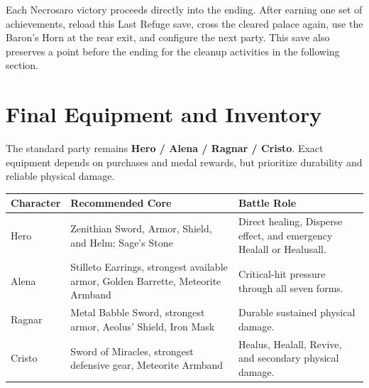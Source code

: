 \documentclass[
  american,
  10pt,
  letterpaper,
  oneside,
  open=any]{scrreprt}
\newcounter{none} %
\newenvironment{guidetable}{%
  \small\setstretch{1.0}%
  \setlength{\tabcolsep}{4pt}%
  \setlength{\LTpre}{8pt}\setlength{\LTpost}{10pt}%
  \renewcommand{\arraystretch}{1.16}%
}{ }
\begin{document}
Each Necrosaro victory proceeds directly into the ending. After earning
one set of achievements, reload this Last Refuge save, cross the cleared
palace again, use the Baron's Horn at the rear exit, and configure the
next party. This save also preserves a point before the ending for the
cleanup activities in the following section.

\section{Final Equipment and
Inventory}\label{final-equipment-and-inventory}

The standard party remains \textbf{Hero / Alena / Ragnar / Cristo}.
Exact equipment depends on purchases and medal rewards, but prioritize
durability and reliable physical damage.

\begin{guidetable}

{\def\LTcaptype{none} %
\begin{longtable}[]{@{}
  >{\raggedright\arraybackslash}p{}
  >{\raggedright\arraybackslash}p{}
  >{\raggedright\arraybackslash}p{}@{}}
\toprule\noalign{}
\begin{minipage}[b]{\linewidth}\raggedright
\color{GuideGreen}\bfseries Character
\end{minipage} & \begin{minipage}[b]{\linewidth}\raggedright
\color{GuideGreen}\bfseries Recommended Core
\end{minipage} & \begin{minipage}[b]{\linewidth}\raggedright
\color{GuideGreen}\bfseries Battle Role
\end{minipage} \\
\midrule\noalign{}
\endhead
\bottomrule\noalign{}
\endlastfoot
Hero & Zenithian Sword, Armor, Shield, and Helm; Sage's Stone & Direct
healing, Disperse effect, and emergency Healall or Healusall. \\
Alena & Stilleto Earrings, strongest available armor, Golden Barrette,
Meteorite Armband & Critical-hit pressure through all seven forms. \\
Ragnar & Metal Babble Sword, strongest armor, Aeolus' Shield, Iron Mask
& Durable sustained physical damage. \\
Cristo & Sword of Miracles, strongest defensive gear, Meteorite Armband
& Healus, Healall, Revive, and secondary physical damage. \\
\end{longtable}
}

\end{guidetable}
\end{document}
